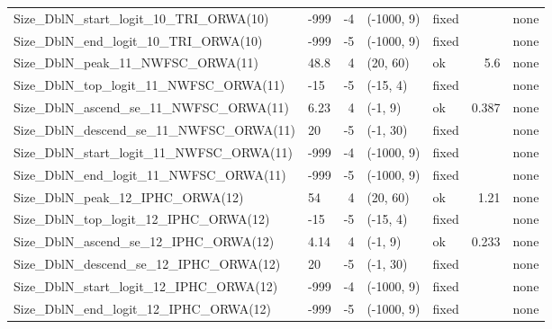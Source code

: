 \documentclass[
]{scrartcl}
\begin{document}
\begin{landscape}
\begin{longtable}{llrllrl}
Size\_DblN\_start\_logit\_10\_TRI\_ORWA(10) & -999 & -4 & (-1000, 9) & fixed &  & none \\ 
Size\_DblN\_end\_logit\_10\_TRI\_ORWA(10) & -999 & -5 & (-1000, 9) & fixed &  & none \\ 
Size\_DblN\_peak\_11\_NWFSC\_ORWA(11) & 48.8 & 4 & (20, 60) & ok & 5.6 & none \\ 
Size\_DblN\_top\_logit\_11\_NWFSC\_ORWA(11) & -15 & -5 & (-15, 4) & fixed &  & none \\ 
Size\_DblN\_ascend\_se\_11\_NWFSC\_ORWA(11) & 6.23 & 4 & (-1, 9) & ok & 0.387 & none \\ 
Size\_DblN\_descend\_se\_11\_NWFSC\_ORWA(11) & 20 & -5 & (-1, 30) & fixed &  & none \\ 
Size\_DblN\_start\_logit\_11\_NWFSC\_ORWA(11) & -999 & -4 & (-1000, 9) & fixed &  & none \\ 
Size\_DblN\_end\_logit\_11\_NWFSC\_ORWA(11) & -999 & -5 & (-1000, 9) & fixed &  & none \\ 
Size\_DblN\_peak\_12\_IPHC\_ORWA(12) & 54 & 4 & (20, 60) & ok & 1.21 & none \\ 
Size\_DblN\_top\_logit\_12\_IPHC\_ORWA(12) & -15 & -5 & (-15, 4) & fixed &  & none \\ 
Size\_DblN\_ascend\_se\_12\_IPHC\_ORWA(12) & 4.14 & 4 & (-1, 9) & ok & 0.233 & none \\ 
Size\_DblN\_descend\_se\_12\_IPHC\_ORWA(12) & 20 & -5 & (-1, 30) & fixed &  & none \\ 
Size\_DblN\_start\_logit\_12\_IPHC\_ORWA(12) & -999 & -4 & (-1000, 9) & fixed &  & none \\ 
Size\_DblN\_end\_logit\_12\_IPHC\_ORWA(12) & -999 & -5 & (-1000, 9) & fixed &  & none \\ 
\bottomrule

\end{longtable}

\endgroup

\end{landscape}

\newpage{}

\begingroup\fontsize{8}{10}\selectfont
\end{document}

